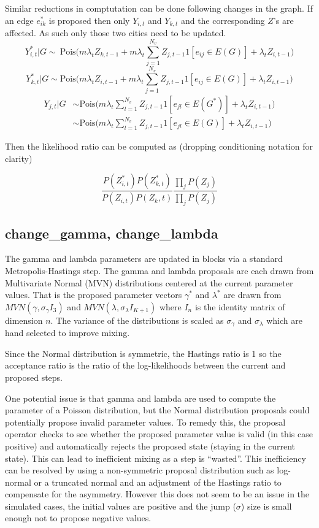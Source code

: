 \documentclass[]{article}
\numberwithin{equation}{section}
\begin{document}
Similar reductions in comptutation can be done following changes in the
graph. If an edge \(e^*_{ik}\) is proposed then only \(Y_{i,t}\) and
\(Y_{k,t}\) and the corresponding \(Z\)'s are affected. As such only
those two cities need to be updated.
\[Y^*_{i,t}|G \sim ~ \text{Pois}\big(m\lambda_tZ_{k,t-1} +m\lambda_t\sum_{j=1}^{N_v}Z_{j,t-1}1[e_{ij}\in E(G)]+ \lambda_tZ_{i,t-1}\big) \]
\[Y^*_{k,t}|G \sim  \text{Pois}\big(m\lambda_tZ_{i,t-1} +m\lambda_t\sum_{j=1}^{N_v}Z_{j,t-1}1[e_{ij}\in E(G)]+ \lambda_tZ_{i,t-1}\big) \]
\[\begin{aligned} Y_{j,t}|G &\sim \text{Pois}\big(m\lambda_t\sum_{l=1}^{N_v}Z_{j,t-1}1[e_{jl}\in E(G^*)]+ \lambda_tZ_{i,t-1}\big)\\ & \sim  \text{Pois}\big(m\lambda_t\sum_{l=1}^{N_v}Z_{j,t-1}1[e_{jl}\in E(G)]+ \lambda_tZ_{i,t-1}\big) \end{aligned}\]

Then the likelihood ratio can be computed as (dropping conditioning
notation for clarity)

\[ \frac{P(Z^*_{i,t})P(Z^*_{k,t})}{P(Z_{i,t})P(Z_k,t)}\frac{\prod_j P(Z_{j})}{\prod_{j}P( Z_{j})} \]

\hypertarget{change_gamma-change_lambda}{%
\subsection{change\_gamma,
change\_lambda}\label{change_gamma-change_lambda}}

The gamma and lambda parameters are updated in blocks via a standard
Metropolis-Hastings step. The gamma and lambda proposals are each drawn
from Multivariate Normal (MVN) distributions centered at the current
parameter values. That is the proposed parameter vectors \(\gamma^*\)
and \(\lambda^*\) are drawn from \(MVN(\gamma, \sigma_\gamma I_3)\) and
\(MVN(\lambda, \sigma_\lambda I_{K+1})\) where \(I_n\) is the identity
matrix of dimension \(n\). The variance of the distributions is scaled
as \(\sigma_\gamma\) and \(\sigma_\lambda\) which are hand selected to
improve mixing.

Since the Normal distribution is symmetric, the Hastings ratio is 1 so
the acceptance ratio is the ratio of the log-likelihoods between the
current and proposed steps.

One potential issue is that gamma and lambda are used to compute the
parameter of a Poisson distribution, but the Normal distribution
proposals could potentially propose invalid parameter values. To remedy
this, the proposal operator checks to see whether the proposed parameter
value is valid (in this case positive) and automatically rejects the
proposed state (staying in the current state). This can lead to
inefficient mixing as a step is ``wasted''. This inefficiency can be
resolved by using a non-symmetric proposal distribution such as
log-normal or a truncated normal and an adjustment of the Hastings ratio
to compensate for the asymmetry. However this does not seem to be an
issue in the simulated cases, the initial values are positive and the
jump (\(\sigma\)) size is small enough not to propose negative values.
\end{document}
